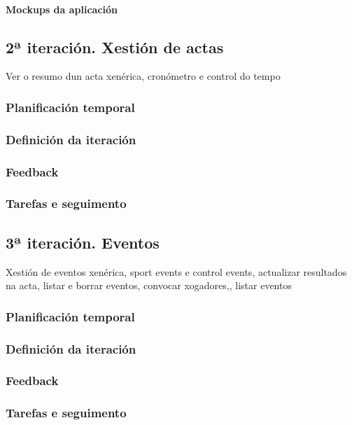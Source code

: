         \paragraph{Mockups da aplicación}
          \subparagraph{}
          \subparagraph{}
          \subparagraph{}

    \subsection{2ª iteración. Xestión de actas}
    Ver o resumo dun acta xenérica, cronómetro e control do tempo 
      \subsubsection{Planificación temporal}
      \subsubsection{Definición da iteración}
      \subsubsection{Feedback}
      \subsubsection{Tarefas e seguimento}

    \subsection{3ª iteración. Eventos}
    Xestión de eventos xenérica, sport events e control events, actualizar resultados na 
  acta, listar e borrar eventos, convocar xogadores,, listar eventos
      \subsubsection{Planificación temporal}
      \subsubsection{Definición da iteración}
      \subsubsection{Feedback}
      \subsubsection{Tarefas e seguimento}

